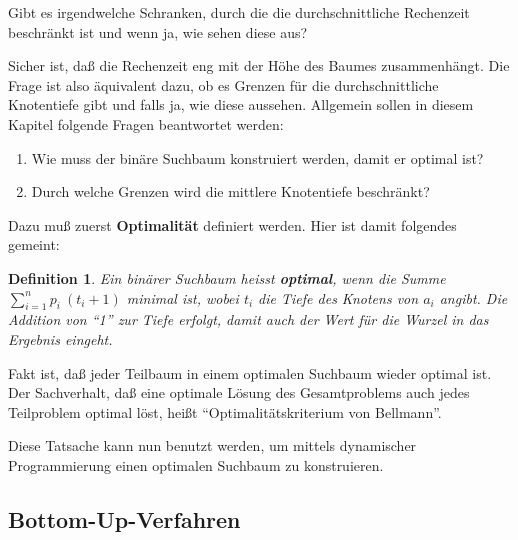 \documentclass[ngerman,draft,parskip=half*,twoside]{scrreprt}
\theoremstyle{break}
\newtheorem{definition}{Definition}
\begin{document}
Gibt es irgendwelche Schranken, durch die die durchschnittliche
Rechenzeit beschränkt ist und wenn ja, wie sehen diese aus? 

Sicher ist, daß die Rechenzeit eng mit der Höhe des
Baumes zusammenhängt. Die Frage ist also äquivalent dazu, ob es Grenzen für die durchschnittliche Knotentiefe gibt und falls ja, wie 
diese aussehen.
Allgemein sollen in diesem Kapitel folgende Fragen beantwortet werden:
\begin{enumerate}
    \item Wie muss der binäre Suchbaum konstruiert werden, damit er optimal ist?
    \item Durch welche Grenzen wird die mittlere Knotentiefe beschränkt?
\end{enumerate}
\noindent
Dazu muß zuerst \textbf{Optimalität} definiert werden. Hier ist damit folgendes gemeint:
 \begin{definition}
   Ein binärer Suchbaum heisst \textbf{optimal}, wenn die Summe $\sum_{i=1}^n p_i\:(t_i+1)$ minimal ist, wobei
      $t_i$ die Tiefe des Knotens von $a_i$ angibt. Die Addition von "`1"' zur Tiefe erfolgt, damit auch der Wert für die Wurzel in
      das Ergebnis eingeht.
    \end{definition}
Fakt ist, daß jeder Teilbaum in einem optimalen Suchbaum wieder optimal ist. Der Sachverhalt, daß eine optimale Lösung des
Gesamtproblems auch jedes Teilproblem optimal löst, heißt "`Optimalitätskriterium von Bellmann"'.

Diese Tatsache kann nun benutzt werden, um mittels dynamischer Programmierung einen optimalen Suchbaum zu konstruieren.

\subsection{Bottom-Up-Verfahren}
\end{document}
